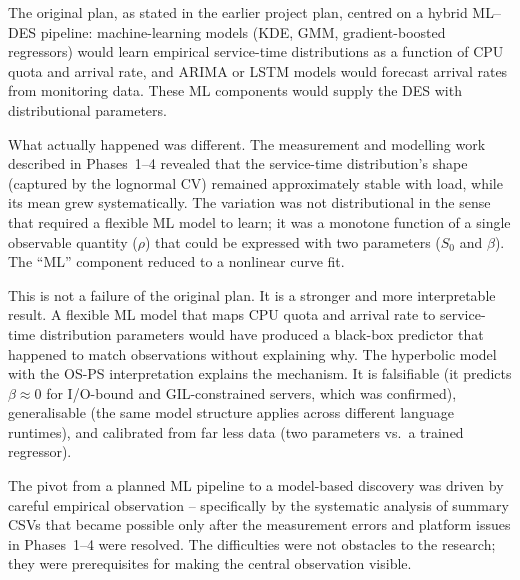 The original plan, as stated in the earlier project plan, centred on a hybrid ML--DES pipeline: machine-learning models (KDE, GMM, gradient-boosted regressors) would learn empirical service-time distributions as a function of CPU quota and arrival rate, and ARIMA or LSTM models would forecast arrival rates from monitoring data. These ML components would supply the DES with distributional parameters.

What actually happened was different. The measurement and modelling work described in Phases~1--4 revealed that the service-time distribution's shape (captured by the lognormal CV) remained approximately stable with load, while its mean grew systematically. The variation was not distributional in the sense that required a flexible ML model to learn; it was a monotone function of a single observable quantity ($\rho$) that could be expressed with two parameters ($S_0$ and $\beta$). The ``ML'' component reduced to a nonlinear curve fit.

This is not a failure of the original plan. It is a stronger and more interpretable result. A flexible ML model that maps CPU quota and arrival rate to service-time distribution parameters would have produced a black-box predictor that happened to match observations without explaining why. The hyperbolic model with the OS-PS interpretation explains the mechanism. It is falsifiable (it predicts $\beta \approx 0$ for I/O-bound and GIL-constrained servers, which was confirmed), generalisable (the same model structure applies across different language runtimes), and calibrated from far less data (two parameters vs.\ a trained regressor).

The pivot from a planned ML pipeline to a model-based discovery was driven by careful empirical observation -- specifically by the systematic analysis of summary CSVs that became possible only after the measurement errors and platform issues in Phases~1--4 were resolved. The difficulties were not obstacles to the research; they were prerequisites for making the central observation visible.


